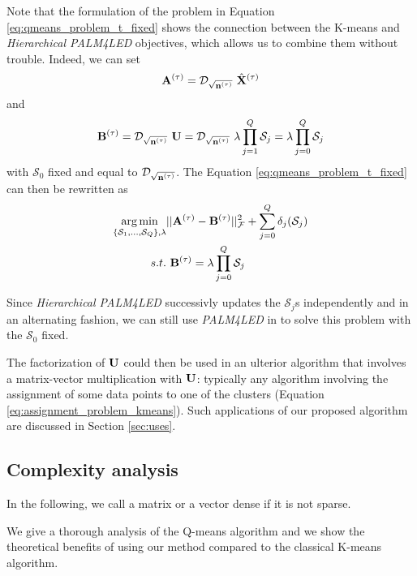 Note that the formulation of the problem in Equation \ref{eq:qmeans_problem_t_fixed} shows the connection between the K-means and \textit{Hierarchical PALM4LED} objectives, which allows us to combine them without trouble. Indeed, we can set
%
\begin{equation*}
{\mathbf{A}}^{(\tau)} = \mathcal{D}_{\sqrt{{\mathbf{n}}^{(\tau)}}}~\hat{{\mathbf{X}}}^{(\tau)}
\end{equation*}
and
\begin{equation*}
{\mathbf{B}}^{(\tau)} = \mathcal{D}_{\sqrt{{\mathbf{n}}^{(\tau)}}}~{\mathbf{U}} = \mathcal{D}_{\sqrt{{\mathbf{n}}^{(\tau)}}}~\lambda \prod_{j=1}^{Q}{\mathcal{S}_j} = \lambda \prod_{j=0}^{Q}{\mathcal{S}_j}
\end{equation*}
%
with $\mathcal{S}_0$ fixed and equal to $\mathcal{D}_{\sqrt{{\mathbf{n}}^{(\tau)}}}$. The Equation \ref{eq:qmeans_problem_t_fixed} can then be rewritten as
%
\begin{equation}
\begin{split}
 \operatorname*{arg\,min}_{\{ \mathcal{S}_1, \ldots,\mathcal{S}_Q\}, \lambda} & ||{\mathbf{A}}^{(\tau)} - {\mathbf{B}}^{(\tau)}||_{\mathcal{F}} ^ 2  +  \sum_{j=0}^{Q} \delta_j(\mathcal{S}_j)\\
 s.t. &~ {\mathbf{B}}^{(\tau)} = \lambda \prod_{j=0}^{Q}{\mathcal{S}_j}
\end{split}
\end{equation}

Since \textit{Hierarchical PALM4LED} successivly updates the $\mathcal{S}_j$s independently and in an alternating fashion, we can still use \textit{PALM4LED} in to solve this problem with the $\mathcal{S}_0$ fixed.





The factorization of ${\mathbf{U}}$ could then be used in an ulterior algorithm that involves a matrix-vector multiplication with ${\mathbf{U}}$: typically any algorithm involving the assignment of some data points to one of the clusters (Equation \ref{eq:assignment_problem_kmeans}). Such applications of our proposed algorithm are discussed in Section \ref{sec:uses}.

\subsection{Complexity analysis}

In the following, we call a matrix or a vector dense if it is not sparse.

We give a thorough analysis of the Q-means algorithm and we show the theoretical benefits of using our method compared to the classical K-means algorithm.


